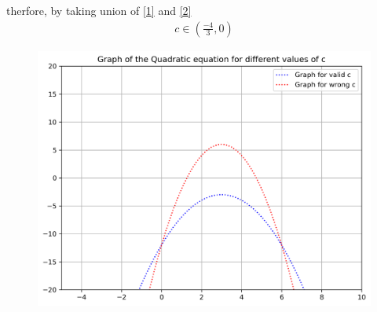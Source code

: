 \documentclass[journal]{IEEEtran}
\begin{document}
therfore, by taking union of \eqref{1} and \eqref{2} 
\begin{align}
    c\in(\frac{-4}{3}, 0)
\end{align}
\newpage
\begin{figure}[H]
    \centering
    \includegraphics[width=\columnwidth]{figs/figure.png}
    \label{fig:placeholder}
\end{figure}
\end{document}
